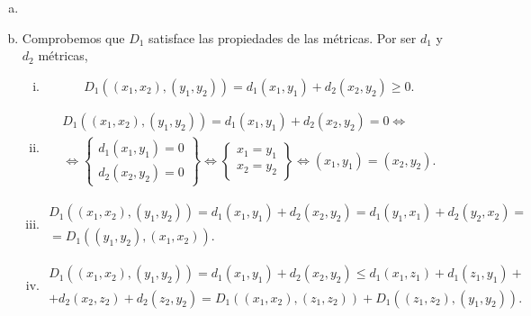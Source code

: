\begin{eje}
    \begin{enumerate}[(a)]
        \item[]
        \item Comprobemos que $D_1$ satisface las propiedades de las métricas. Por ser $d_1$ y $d_2$ métricas,
        \begin{enumerate}[i)]
            \item 
            \[
                D_1 \left( \left( x_1, x_2 \right) , \left( y_1 , y_2 \right) \right) = d_1 \left( x_1, y_1\right) + d_2 \left( x_2 , y_2 \right) \geq 0.
            \]
            \item 
            \begin{gather*}
                D_1 \left( \left( x_1, x_2 \right) , \left( y_1 , y_2 \right) \right) = d_1 \left( x_1, y_1\right) + d_2 \left( x_2 , y_2 \right) = 0 \iff \\
                \iff \left\{ \begin{array}{c}
                    d_1 \left( x_1, y_1 \right) = 0 \\
                    d_2 \left( x_2, y_2 \right) = 0
                \end{array} \right\} \iff \left\{ \begin{array}{c}
                    x_1=y_1 \\
                    x_2=y_2
                \end{array} \right\} \iff \left( x_1, y_1 \right) = \left( x_2, y_2 \right).
            \end{gather*}
            \item 
            \begin{gather*}
                D_1 \left( \left( x_1, x_2 \right) , \left( y_1 , y_2 \right) \right) = d_1 \left( x_1, y_1 \right) + d_2 \left( x_2 , y_2 \right) = d_1 \left( y_1, x_1 \right) + d_2 \left( y_2 , x_2 \right)= \\
                =D_1 \left( \left( y_1, y_2 \right) , \left( x_1 , x_2 \right) \right) .
            \end{gather*}
            \item 
            \begin{gather*}
                D_1 \left( \left( x_1, x_2 \right) , \left( y_1 , y_2 \right) \right) = d_1 \left( x_1, y_1 \right) + d_2 \left( x_2 , y_2 \right) \leq d_1 \left( x_1, z_1 \right) + d_1 \left( z_1, y_1 \right) + \\
                + d_2 \left( x_2, z_2 \right) + d_2 \left( z_2, y_2 \right) = D_1 \left( \left( x_1, x_2 \right) , \left( z_1 , z_2 \right) \right) + D_1 \left( \left( z_1, z_2 \right) , \left( y_1 , y_2 \right) \right).

\end{gather*}
\end{enumerate}
\end{enumerate}
\end{eje}
